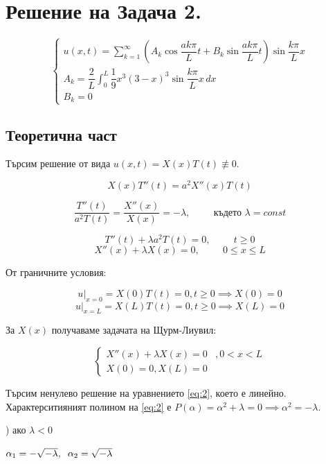 \documentclass[14pt]{extarticle}
\let\frac\dfrac
\begin{document}
\section{Решение на Задача 2.}

\[
\left\{
	\begin{array}{ll}
		\displaystyle u(x,t) = \sum_{k=1}^{\infty} \left( A_k\cos\frac{ak\pi}{L}t + B_k\sin\frac{ak\pi}{L}t \right) \sin\frac{k\pi}{L}x \\
		\displaystyle A_k = \frac{2}{L} \int_0^L \frac{1}{9}x^3(3-x)^3 \sin\frac{k\pi}{L}x \, dx \\
		B_k = 0
	\end{array}
\right.
\]

\subsection{Теоретична част}

Търсим решение от вида $u(x,t) = X(x)T(t) \not\equiv 0$.

\[ X(x)T''(t) = a^2X''(x)T(t) \]

\[ \frac{T''(t)}{a^2T(t)} = \frac{X''(x)}{X(x)} = -\lambda , \hspace{1cm} \mbox{където } \lambda = const \]

\[ T''(t) + \lambda a^2T(t) = 0 , \hspace{1cm} t \geq 0 \]
\[ X''(x) + \lambda X(x) = 0 , \hspace{1cm} 0 \leq x \leq L \]

От граничните условия:

\[ u \big|_{x=0} = X(0)T(t) = 0 , t \geq 0 \implies X(0) = 0 \]
\[ u \big|_{x=L} = X(L)T(t) = 0 , t \geq 0 \implies X(L) = 0 \]

За $X(x)$ получаваме задачата на Щурм-Лиувил:

\begin{equation}
\left\{
	\begin{array}{ll}
		X''(x) + \lambda X(x) = 0 & , 0 < x < L \\ \tag{2}\label{eq:2}
		X(0) = 0, X(L) = 0
	\end{array}
\right.
\end{equation}

Търсим ненулево решение на уравнението \eqref{eq:2}, което е линейно. Характерситияният полином на \eqref{eq:2} е $P(\alpha) = \alpha^2 + \lambda = 0 \implies \alpha^2 = -\lambda$.

) ако $\lambda < 0$

$ \alpha_1 = -\sqrt{-\lambda}, \hspace{2mm} \alpha_2 = \sqrt{-\lambda} $
\end{document}
